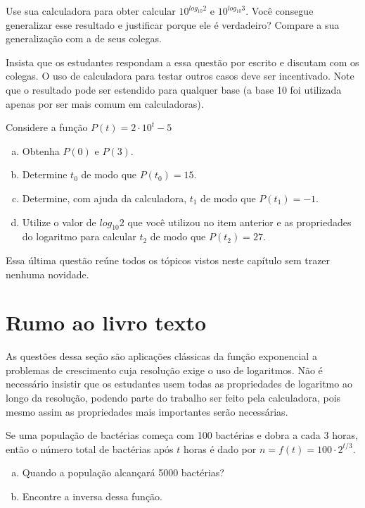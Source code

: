 \documentclass[main_estudante.tex]{subfiles}
\begin{document}
\begin{reflita}
 Use sua calculadora para obter calcular $10^{log_{10} 2}$ e $10^{log_{10} 3}$. Você consegue generalizar esse resultado e justificar porque ele é verdadeiro? Compare a sua generalização com a de seus colegas.
\end{reflita}

Insista que os estudantes respondam a essa questão por escrito e discutam com os colegas. O uso de calculadora para testar outros casos deve ser incentivado. Note que o resultado pode ser estendido para qualquer base (a base 10 foi utilizada apenas por ser mais comum em calculadoras).

\begin{questao}
Considere a função $P(t)=2 \cdot 10^t - 5$
\begin{enumerate}[a)]
\item Obtenha $P(0)$ e $P(3)$.
\item Determine $t_0$ de modo que $P(t_0)=15$.
\item Determine, com ajuda da calculadora, $t_1$ de modo que $P(t_1)=-1$.
\item Utilize o valor de $log_{10} 2$ que você utilizou no item anterior e as propriedades do logaritmo para calcular $t_2$ de modo que $P(t_2)=27$.
\end{enumerate}
\end{questao}

Essa última questão reúne todos os tópicos vistos neste capítulo sem trazer nenhuma novidade.

\section{Rumo ao livro texto}

As questões dessa seção são aplicações clássicas da função exponencial a problemas de crescimento cuja resolução exige o uso de logaritmos. Não é necessário insistir que os estudantes usem todas as propriedades de logaritmo ao longo da resolução, podendo parte do trabalho ser feito pela calculadora, pois mesmo assim as propriedades mais importantes serão necessárias.

\begin{resolvida}
Se uma população de bactérias começa com 100 bactérias e dobra a cada 3 horas, então o número total de bactérias após $t$ horas é dado por $n= f(t) = 100 \cdot 2^{t/3}$.
\begin{enumerate}[a)]
 \item Quando a população alcançará 5000 bactérias?
 \item Encontre a inversa dessa função.
\end{enumerate}
\end{resolvida}
\end{document}

